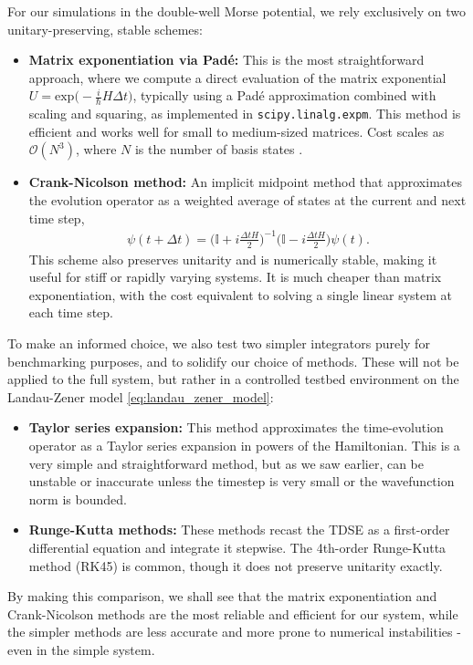 \documentclass{subfiles}
\begin{document}
For our simulations in the double-well Morse potential, we rely exclusively on two unitary-preserving, stable schemes:
\begin{itemize}
    \item \textbf{Matrix exponentiation via Padé:} This is the most straightforward approach, where we compute a direct evaluation of the matrix exponential $U=\text{exp}\big(-\frac{i}{\hbar}H\Delta t)$, typically using a Padé approximation combined with scaling and squaring, as implemented in \texttt{scipy.linalg.expm}. This method is efficient and works well for small to medium-sized matrices. Cost scales as $\mathcal{O}(N^3)$, where $N$ is the number of basis states \cite{Al-Mohy_Higham_2010}.
    \item \textbf{Crank-Nicolson method:} An implicit midpoint method that approximates the evolution operator as a weighted average of states at the current and next time step,
    \begin{align*}
        \psi(t + \Delta t) = \bigg(\mathbb{I} + i\frac{\Delta t H}{2}\bigg)^{-1} \bigg(\mathbb{I} - i\frac{\Delta t H}{2}\bigg) \psi(t).
    \end{align*}
    This scheme also preserves unitarity and is numerically stable, making it useful for stiff or rapidly varying systems. It is much cheaper than matrix exponentiation, with the cost equivalent to solving a single linear system at each time step.
\end{itemize}
To make an informed choice, we also test two simpler integrators purely for benchmarking purposes, and to solidify our choice of methods. These will not be applied to the full system, but rather in a controlled testbed environment on the Landau-Zener model \eqref{eq:landau_zener_model}:
\begin{itemize}
    \item \textbf{Taylor series expansion:} This method approximates the time-evolution operator as a Taylor series expansion in powers of the Hamiltonian. This is a very simple and straightforward method, but as we saw earlier, can be unstable or inaccurate unless the timestep is very small or the wavefunction norm is bounded.
    \item \textbf{Runge-Kutta methods:} These methods recast the TDSE as a first-order differential equation and integrate it stepwise. The 4th-order Runge-Kutta method (RK45) is common, though it does not preserve unitarity exactly.
\end{itemize}
By making this comparison, we shall see that the matrix exponentiation and Crank-Nicolson methods are the most reliable and efficient for our system, while the simpler methods are less accurate and more prone to numerical instabilities - even in the simple system.
\end{document}
